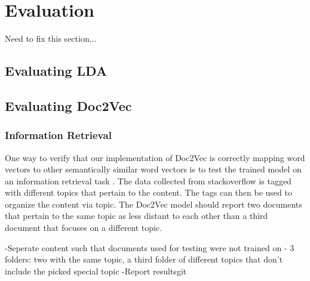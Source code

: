 
\section{Evaluation}
Need to fix this section...

\subsection{Evaluating LDA}

\subsection{Evaluating Doc2Vec}

\subsubsection{Information Retrieval}

One way to verify that our implementation of Doc2Vec is correctly mapping word vectors to other semantically similar word vectors is to test the trained model on an information retrieval task . \cite{RefWorks:doc:5a6e5746e4b0d609eec798d7} The data collected from stackoverflow is tagged with different topics that pertain to the content. The tags can then be used to organize the content via topic. The Doc2Vec model should report two documents that pertain to the same topic as less distant to each other than a third document that focuses on a different topic.

-Seperate content such that documents used for testing were not trained on
- 3 folders: two with the same topic, a third folder of different topics that don't include the picked special topic
-Report resultsgit
